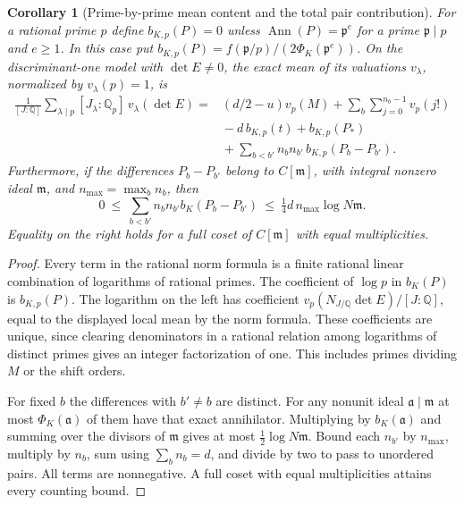 \documentclass[a4paper,11pt]{article}
\newtheorem{corollary}[proposition]{Corollary}
\theoremstyle{definition}
\theoremstyle{remark}
\numberwithin{equation}{section}
\begin{document}
\begin{corollary}[Prime-by-prime mean content and the total pair contribution]\leavevmode
\label{cor:localjetnorm487}
For a rational prime \(p\) define \(b_{K,p}(P)=0\) unless
\(\operatorname{Ann}(P)=\mathfrak p^e\) for a prime
\(\mathfrak p\mid p\) and \(e\ge1\). In this case put
\(b_{K,p}(P)=f(\mathfrak p/p)/(2\Phi_K(\mathfrak p^e))\).
On the discriminant-one model with \(\det E\ne0\), the exact
mean of its valuations \(v_\lambda\), normalized by \(v_\lambda(p)=1\),
is
\[
\begin{aligned}
 \frac{1}{[J:\mathbb Q]}\sum_{\lambda\mid p}
      [J_\lambda:\mathbb Q_p]\,v_\lambda(\det E)
   ={}&(d/2-u)v_p(M)+\sum_b\sum_{j=0}^{n_b-1}v_p(j!)\\
     &{}-d\,b_{K,p}(t)+b_{K,p}(P_*)\\
     &{}+\sum_{b<b'}n_bn_{b'}\,b_{K,p}(P_b-P_{b'}).
\end{aligned}
\]
Furthermore, if the differences \(P_b-P_{b'}\) belong to
\(C[\mathfrak m]\), with integral nonzero ideal \(\mathfrak m\),
and \(n_{\max}=\max_b n_b\), then
\[
 0\ \le\ \sum_{b<b'}n_bn_{b'}b_K(P_b-P_{b'})
              \ \le\ \tfrac14 d\, n_{\max}\log N\mathfrak m .
\]
Equality on the right holds for a full coset of
\(C[\mathfrak m]\) with equal multiplicities.
\end{corollary}
\begin{proof}
Every term in the rational norm formula is a finite rational
linear combination of logarithms of rational primes. The
coefficient of \(\log p\) in \(b_K(P)\) is \(b_{K,p}(P)\).
The logarithm on the left has coefficient
\(v_p(N_{J/\mathbb Q}\det E)/[J:\mathbb Q]\), equal to the
displayed local mean by the norm formula. These coefficients
are unique, since clearing denominators in a rational relation
among logarithms of distinct primes gives an integer
factorization of one. This includes primes dividing \(M\) or the
shift orders.

For fixed \(b\) the differences with \(b'\ne b\) are distinct.
For any nonunit ideal \(\mathfrak a\mid\mathfrak m\) at most
\(\Phi_K(\mathfrak a)\) of them have that exact annihilator.
Multiplying by \(b_K(\mathfrak a)\) and summing over the
divisors of \(\mathfrak m\) gives at most
\(\tfrac12\log N\mathfrak m\). Bound each \(n_{b'}\) by
\(n_{\max}\), multiply by \(n_b\), sum using \(\sum_b n_b=d\),
and divide by two to pass to unordered pairs. All terms are
nonnegative. A full coset with equal multiplicities attains
every counting bound.
\end{proof}
\end{document}
